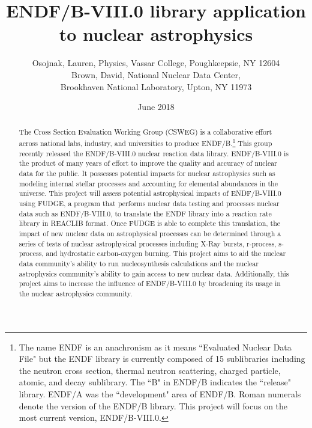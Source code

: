 \documentclass{article}
\title{ENDF/B-VIII.0 library application to nuclear astrophysics}
\author{Osojnak, Lauren, Physics, Vassar College, Poughkeepsie, NY 12604 \\ Brown, David, National Nuclear Data Center, \\ Brookhaven National Laboratory, Upton, NY 11973}
\date{June 2018}
\begin{document}
\maketitle
\begin{abstract}
The Cross Section Evaluation Working Group (CSWEG) is a collaborative effort across national labs, industry, and universities to produce ENDF/B.\footnote{The name ENDF is an anachronism as it means ``Evaluated Nuclear Data File" but the ENDF library is currently composed of 15 sublibraries including the neutron cross section, thermal neutron scattering, charged particle, atomic, and decay sublibrary. The ``B" in ENDF/B indicates the ``release" library. ENDF/A was the ``development" area of ENDF/B. Roman numerals denote the version of the ENDF/B library. This project will focus on the most current version, ENDF/B-VIII.0.} This group recently released the ENDF/B-VIII.0 nuclear reaction data library. ENDF/B-VIII.0 is the product of many years of effort to improve the quality and accuracy of nuclear data for the public. It possesses potential impacts for nuclear astrophysics such as modeling internal stellar processes and accounting for elemental abundances in the universe. This project will assess potential astrophysical impacts of ENDF/B-VIII.0 using FUDGE, a program that performs nuclear data testing and processes nuclear data such as ENDF/B-VIII.0, to translate the ENDF library into a reaction rate library in REACLIB format. Once FUDGE is able to complete this translation, the impact of new nuclear data on astrophysical processes can be determined through a series of tests of nuclear astrophysical processes including X-Ray bursts, r-process, s-process, and hydrostatic carbon-oxygen burning. This project aims to aid the nuclear data community's ability to run nucleosynthesis calculations and the nuclear astrophysics community's ability to gain access to new nuclear data. Additionally, this project aims to increase the influence of ENDF/B-VIII.0 by broadening its usage in the nuclear astrophysics community. 
\end{abstract}
\end{document}
